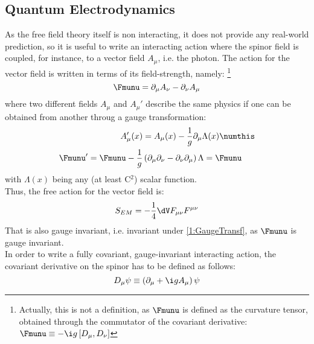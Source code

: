 \subsection{Quantum Electrodynamics}
As the free field theory itself is non interacting, it does not provide any real-world prediction, so it is useful to write an interacting action where the spinor field is coupled, for instance, to a vector field $A_\mu$, i.e. the photon.
The action for the vector field is written in terms of its field-strength, namely:
\footnote{Actually, this is not a definition, as $\Fmunu$ is defined as the curvature tensor, obtained through the commutator of the covariant derivative: $\Fmunu\equiv-\i g\left[D_\mu,D_\nu\right]$}
\begin{equation}
    \Fmunu = \partial_\mu A_\nu - \partial_\nu A_\mu \label{1:FieldStrU1}
\end{equation}
where two different fields $A_\mu$ and $A_\mu'$ describe the same physics if one can be obtained from another throug a gauge transformation:
\begin{align*}
    A_\mu'(x) &= A_\mu(x) - \frac1g \partial_\mu\Lambda(x) \numthis\label{1:GaugeTransf} \\
    \Fmunu' = \Fmunu - \frac1g&\left( \partial_\mu\partial_\nu-\partial_\nu\partial_\mu \right)\Lambda = \Fmunu
\end{align*}
with $\Lambda(x)$ being any (at least C$^2$) scalar function.\\
Thus, the free action for the vector field is:
\begin{equation}
    S_{EM} = -\frac14\dV F_{\mu\nu}F^{\mu\nu} \label{1:FreeMaxwellAction}
\end{equation}
That is also gauge invariant, i.e. invariant under \eqref{1:GaugeTransf}, as $\Fmunu$ is gauge invariant.\\
In order to write a fully covariant, gauge-invariant interacting action, the covariant derivative on the spinor has to be defined as follows:
\begin{equation}
    D_\mu\psi \equiv \left( \partial_\mu+\i g A_\mu \right)\psi \label{1:CovDeriv}
\end{equation}

